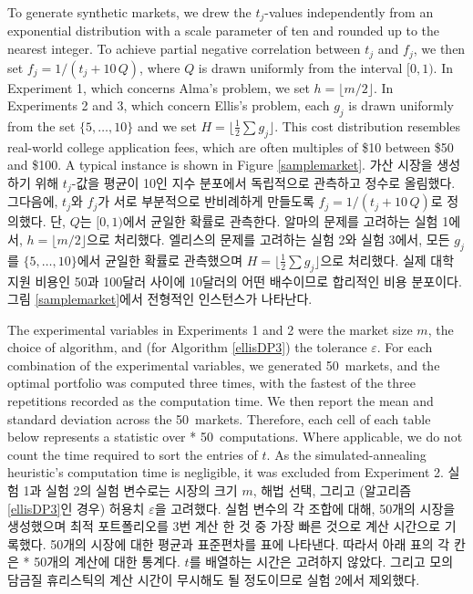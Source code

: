 \documentclass[11pt]{article} %
\theoremstyle{definition}
\theoremstyle{definition}
\begin{document}
\def\nmarkets{50}
\ifen
To generate synthetic markets, we drew the $t_j$-values independently from an exponential distribution with a scale parameter of ten and rounded up to the nearest integer. To achieve partial negative correlation between $t_j$ and $f_j$, we then set $f_j = 1 / (t_j + 10\,Q)$, where $Q$ is drawn uniformly from the interval $[0, 1)$. In Experiment 1, which concerns Alma's problem, we set $h = \lfloor m/ 2 \rfloor$. In Experiments 2 and 3, which concern Ellis's problem, each $g_j$ is drawn uniformly from the set $\{5, \dots, 10\}$ and we set $H = \lfloor \frac{1}{2} \sum g_j \rfloor$. This cost distribution resembles real-world college application fees, which are often multiples of \$10 between \$50 and \$100. A typical instance is shown in Figure \ref{samplemarket}.
\else
가산 시장을 생성하기 위해 $t_j$-값을 평균이 10인 지수 분포에서 독립적으로 관측하고 정수로 올림했다. 그다음에, $t_j$와 $f_j$가 서로 부분적으로 반비례하게 만들도록 $f_j = 1 / (t_j + 10\,Q)$로 정의했다. 단, $Q$는 $[0, 1)$에서 균일한 확률로 관측한다. 알마의 문제를 고려하는 실험 1에서, $h = \lfloor m/ 2 \rfloor$으로 처리했다. 엘리스의 문제를 고려하는 실험 2와 실험 3에서, 모든  $g_j$를 $\{5, \dots, 10\}$에서 균일한 확률로 관측했으며 $H = \lfloor \frac{1}{2} \sum g_j \rfloor$으로 처리했다. 실제 대학 지원 비용인 50과 100달러 사이에 10달러의 어떤 배수이므로 합리적인 비용 분포이다. 그림 \ref{samplemarket}에서 전형적인 인스턴스가 나타난다.
\fi

\ifen
The experimental variables in Experiments 1 and 2 were the market size $m$, the choice of algorithm, and (for Algorithm \ref{ellisDP3}) the tolerance $\varepsilon$. For each combination of the experimental variables, we generated \nmarkets~markets, and the optimal portfolio was computed three times, with the fastest of the three repetitions recorded as the computation time. We then report the mean and standard deviation across the \nmarkets~markets. Therefore, each cell of each table below represents a statistic over {\the{} * \nmarkets \relax}~computations. Where applicable, we do not count the time required to sort the entries of $t$. As the simulated-annealing heuristic's computation time is negligible, it was excluded from Experiment 2. 
\else
실험 1과 실험 2의 실험 변수로는 시장의 크기 $m$, 해법 선택, 그리고 (알고리즘 \ref{ellisDP3}인 경우) 허용치 $\varepsilon$을 고려했다. 실험 변수의 각 조합에 대해,  \nmarkets 개의 시장을 생성했으며 최적 포트폴리오를 3번 계산 한 것 중 가장 빠른 것으로 계산 시간으로 기록했다. \nmarkets 개의 시장에 대한 평균과 표준편차를 표에 나타낸다. 따라서 아래 표의 각 칸은 {\the{} * \nmarkets \relax}개의 계산에 대한 통계다. $t$를 배열하는 시간은 고려하지 않았다. 그리고 모의 담금질 휴리스틱의 계산 시간이 무시해도 될 정도이므로 실험 2에서 제외했다. 
\fi
\end{document}
